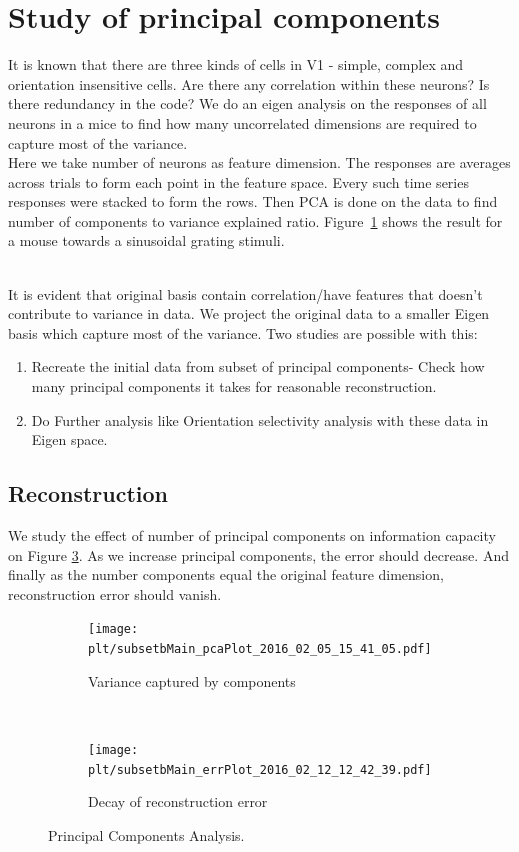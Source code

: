 \documentclass[11pt]{article}
\newcommand{\plt}{../../plots}
\begin{document}
\section{Study of principal components} %
\label{sec:study_of_correlation}
It is known that there are three kinds of cells in V1 - simple, complex and orientation insensitive cells. Are there any correlation within these neurons? Is there redundancy in the code? We do an eigen analysis on the responses of all neurons in a mice to find how many uncorrelated dimensions are required to capture most of the variance.\\
Here we take number of neurons as feature dimension. The responses are averages across trials to form each point in the feature space. Every such time series responses were stacked to form the rows. Then PCA is done on the data to find number of components to variance explained ratio. Figure~\ref{img:pca} shows the result for a mouse towards a sinusoidal grating stimuli.
\begin{figure}
    \centering

\end{figure}\\
It is evident that original basis contain correlation/have features that doesn't contribute to variance in data. We project the original data to a smaller Eigen basis which capture most of the variance. Two studies are possible with this:
\begin{enumerate}
    \item Recreate the initial data from subset of principal components- Check how many principal components it takes for reasonable reconstruction.
    \item Do Further analysis like Orientation selectivity analysis with these data in Eigen space.
\end{enumerate}
\subsection{Reconstruction} %
\label{sub:reconstruction}
We study the effect of number of principal components on information capacity on Figure \ref{img:reconstruction}. As we increase principal components, the error should decrease. And finally as the number components equal the original feature dimension, reconstruction error should vanish.
\begin{figure}
    \centering
    \begin{subfigure}[b]{.48\textwidth}
        \centering
        \texttt{[image: \\plt/subsetbMain\_pcaPlot\_2016\_02\_05\_15\_41\_05.pdf]}
        \caption{Variance captured by components}
        \label{img:pca}
    \end{subfigure}
    ~
    \begin{subfigure}[b]{.48\textwidth}
        \centering
        \texttt{[image: \\plt/subsetbMain\_errPlot\_2016\_02\_12\_12\_42\_39.pdf]}
        \caption{Decay of reconstruction error}
        \label{img:reconstruction}
    \end{subfigure}
    \caption{Principal Components Analysis.}
\end{figure}
\end{document}
